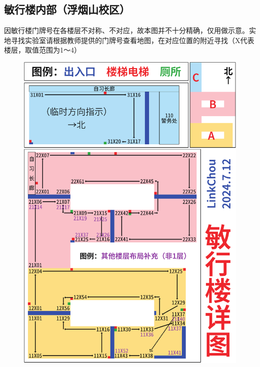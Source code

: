 \subsection[敏行楼内部（浮烟山校区）]{敏行楼内部（浮烟山校区）}
因敏行楼门牌号在各楼层不对称、不对应，故本图并不十分精确，仅用做示意。实地寻找实验室请根据教师提供的门牌号查看地图，在对应位置的附近寻找（X代表楼层，取值范围为1～4）
\begin{figure}[H]
    \centering
    \includegraphics*[height=0.9\textheight]{resources/map/浮烟山校区敏行楼_矢量.pdf}
    \label{map_fuyanshan_minxing}
\end{figure}

\newpage
